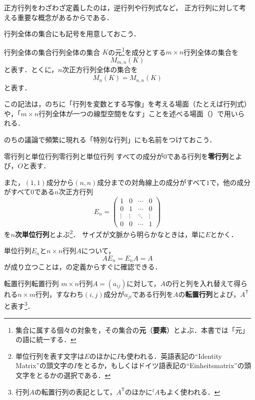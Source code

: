 正方行列をわざわざ定義したのは，逆行列や行列式など，
正方行列に対して考える重要な概念があるからである．

行列全体の集合にも記号を用意しておこう．

\begin{definition}{行列全体の集合}{行列全体の集合}
  $K$の元\footnote{集合に属する個々の対象を，その集合の\textbf{元}（\textbf{要素}）とよぶ．本書では「元」の語に統一する．}を成分とする$m \times n$行列全体の集合を
  \[
    M_{m,n}(K)
  \]
  と表す．とくに，$n$次正方行列全体の集合を
  \[
    M_n(K) = M_{n,n}(K)
  \]
  と表す．
\end{definition}

この記法は，のちに「行列を変数とする写像」を考える場面（たとえば行列式）や，「$m \times n$行列全体が一つの線型空間をなす」ことを述べる場面（）で用いられる．

のちの議論で頻繁に現れる「特別な行列」にも名前をつけておこう．

\begin{definition}{零行列と単位行列}{零行列と単位行列}
  すべての成分が$0$である行列を\textbf{零行列}とよび，$O$と表す．

  また，$(1,1)$成分から$(n,n)$成分までの対角線上の成分がすべて$1$で，他の成分がすべて$0$である$n$次正方行列
  \[
    E_n =
    \begin{pmatrix}
      1 & 0 & \cdots & 0 \\
      0 & 1 & \cdots & 0 \\
      \vdots & \vdots & \ddots & \vdots \\
      0 & 0 & \cdots & 1
    \end{pmatrix}
  \]
  を\textbf{$n$次単位行列}とよぶ\footnote{単位行列を表す文字は$E$のほかに$I$も使われる．英語表記の``Identity Matrix''の頭文字の$I$をとるか，もしくはドイツ語表記の``Einheitsmatrix''の頭文字をとるかの選択である．}．
  サイズが文脈から明らかなときは，単に$E$とかく．
\end{definition}

単位行列$E_n$と$n \times n$行列$A$について，
\[
 A E_n = E_n A = A
\]
が成り立つことは，の定義からすぐに確認できる．

\begin{definition}{転置行列}{転置行列}
  $m \times n$行列$A = (a_{ij})$に対して，$A$の行と列を入れ替えて得られる$n \times m$行列，すなわち$(i, j)$成分が$a_{ji}$である行列を$A$の\textbf{転置行列}とよび，$A^\mathsf{T}$と表す\footnote{行列$A$の転置行列の表記として，$A^\mathsf{T}$のほかに${}^t A$もよく使われる．}．
\end{definition}

